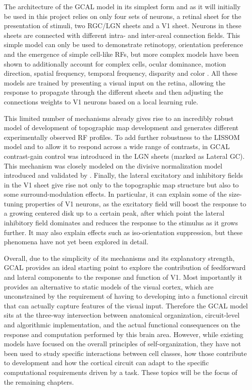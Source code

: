 The architecture of the GCAL model in its simplest form and as it will
initially be used in this project relies on only four sets of neurons,
a retinal sheet for the presentation of stimuli, two RGC/LGN sheets
and a V1 sheet. Neurons in these sheets are connected with different
intra- and inter-areal connection fields. This simple model can only
be used to demonstrate retinotopy, orientation preference and the
emergence of simple cell-like RFs, but more complex models have been
shown to additionally account for complex cells, ocular dominance,
motion direction, spatial frequency, temporal frequency, disparity and
color \citep{Bednar2012a}. All these models are trained by presenting
a visual input on the retina, allowing the response to propagate
through the different sheets and then adjusting the connections
weights to V1 neurons based on a local learning rule.

This limited number of mechanisms already gives rise to an incredibly
robust model of development of topographic map development and
generates different experimentally observed RF profiles. To add
further robustness to the LISSOM model and to allow it to respond
across a wide range of contrasts, in GCAL contrast-gain control was
introduced in the LGN sheets (marked as Lateral GC). This mechanism
was closely modeled on the divisive normalization model introduced and
validated by \cite{Bonin2005}. Finally, the lateral excitatory and
inhibitory fields in the V1 sheet give rise not only to the
topographic map structure but also to some surround-modulation
effects. In particular, it can explain some of the size-tuning
properties of V1 neurons, as the excitatory field will boost the
response to a growing centered disk up to a certain peak, after which
point the lateral inhibitory field dominates and reduces the response
to the stimulus as it grows further.
It may also explain effects such as iso-orientation
suppression, but these phenomena have not yet been explored in detail.

Overall, due to the simplicity of its mechanisms and its explanatory
strength, GCAL provides an ideal starting point to explore the
contribution of feedforward and lateral components to the response and
function of V1. Most importantly it provides an alternative to
static models of the visual cortex, which are unconstrained by the
requirement of having to developing into a functional circuit that can
actually capture features of the visual input. Therefore the GCAL
model sits at the three-way intersection between anatomical
organization, circuit-level and algorithmic implementation, and the
actual functional consequences on the response and computation
performed by this brain area. However, while existing models have
focused on the overall principles of self-organization, they have not
been used to study specific interactions between cell classes, how
those contribute to development and how the cortical circuit can adapt
to the specific computational requirements driven by a task.  These
topics will be the focus of the remaining chapters.
